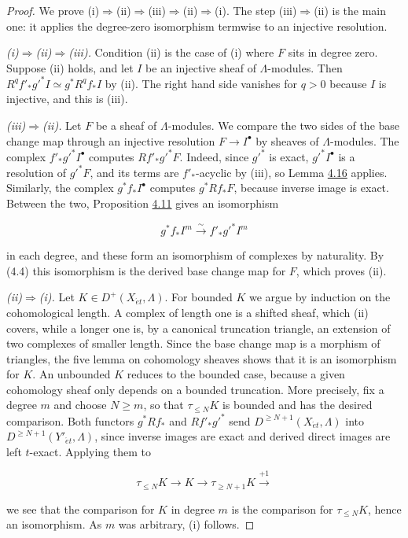 \documentclass[11pt]{article}
\begin{document}
\begin{proof}[{Proof}]\label{bp330}%
We prove (i)\(\Rightarrow\)(ii)\(\Rightarrow\)(iii)\(\Rightarrow\)(ii)\(\Rightarrow\)(i). The step (iii)\(\Rightarrow\)(ii) is the main one: it applies the degree-zero isomorphism termwise to an injective resolution.

\emph{(i)\(\Rightarrow\)(ii)\(\Rightarrow\)(iii).} Condition (ii) is the case of (i) where \(F\) sits in degree zero. Suppose (ii) holds, and let \(I\) be an injective sheaf of \(\Lambda\)-modules. Then \(R^qf'_*g'^*I\simeq g^*R^qf_*I\) by (ii). The right hand side vanishes for \(q>0\) because \(I\) is injective, and this is (iii).

\emph{(iii)\(\Rightarrow\)(ii).} Let \(F\) be a sheaf of \(\Lambda\)-modules. We compare the two sides of the base change map through an injective resolution \(F\to I^\bullet\) by sheaves of \(\Lambda\)-modules. The complex \(f'_*g'^*I^\bullet\) computes \(Rf'_*g'^*F\). Indeed, since \(g'^*\) is exact, \(g'^*I^\bullet\) is a resolution of \(g'^*F\), and its terms are \(f'_*\)-acyclic by (iii), so Lemma \hyperref[bp326]{4.16} applies. Similarly, the complex \(g^*f_*I^\bullet\) computes \(g^*Rf_*F\), because inverse image is exact. Between the two, Proposition \hyperref[bp314]{4.11} gives an isomorphism

\[
g^*f_*I^m\xrightarrow{\sim} f'_*g'^*I^m
\]

in each degree, and these form an isomorphism of complexes by naturality. By (4.4) this isomorphism is the derived base change map for \(F\), which proves (ii).

\emph{(ii)\(\Rightarrow\)(i).} Let \(K\in D^+(X_{\acute{e}t},\Lambda)\). For bounded \(K\) we argue by induction on the cohomological length. A complex of length one is a shifted sheaf, which (ii) covers, while a longer one is, by a canonical truncation triangle, an extension of two complexes of smaller length. Since the base change map is a morphism of triangles, the five lemma on cohomology sheaves shows that it is an isomorphism for \(K\). An unbounded \(K\) reduces to the bounded case, because a given cohomology sheaf only depends on a bounded truncation. More precisely, fix a degree \(m\) and choose \(N\geq m\), so that \(\tau_{\leq N}K\) is bounded and has the desired comparison. Both functors \(g^*Rf_*\) and \(Rf'_*g'^*\) send \(D^{\geq N+1}(X_{\acute{e}t},\Lambda)\) into \(D^{\geq N+1}(Y'_{\acute{e}t},\Lambda)\), since inverse images are exact and derived direct images are left \(t\)-exact. Applying them to

\[
\tau_{\leq N}K\longrightarrow K\longrightarrow
\tau_{\geq N+1}K\xrightarrow{+1}
\]

we see that the comparison for \(K\) in degree \(m\) is the comparison for \(\tau_{\leq N}K\), hence an isomorphism. As \(m\) was arbitrary, (i) follows.
\end{proof}
\end{document}
